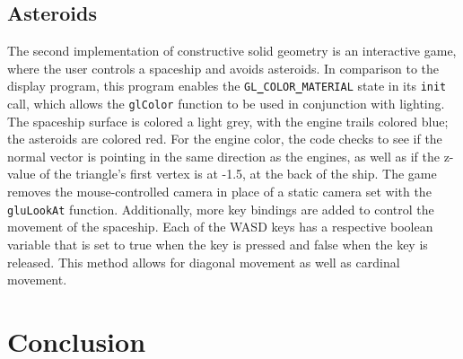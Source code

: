 \documentclass[12pt]{article}
\begin{document}
\begin{doublespace}
\subsection{Asteroids}
The second implementation of constructive solid geometry is an interactive game, where the user controls a spaceship and avoids asteroids. In comparison to the display program, this program enables the \texttt{GL{\bf\_}COLOR{\bf\_}MATERIAL} state in its \texttt{init} call, which allows the \texttt{glColor} function to be used in conjunction with lighting. The spaceship surface is colored a light grey, with the engine trails colored blue; the asteroids are colored red. For the engine color, the code checks to see if the normal vector is pointing in the same direction as the engines, as well as if the z-value of the triangle's first vertex is at -1.5, at the back of the ship. The game removes the mouse-controlled camera in place of a static camera set with the \texttt{gluLookAt} function. Additionally, more key bindings are added to control the movement of the spaceship. Each of the WASD keys has a respective boolean variable that is set to true when the key is pressed and false when the key is released. This method allows for diagonal movement as well as cardinal movement. 
\section{Conclusion}

\newpage
\end{doublespace}
\end{document}
